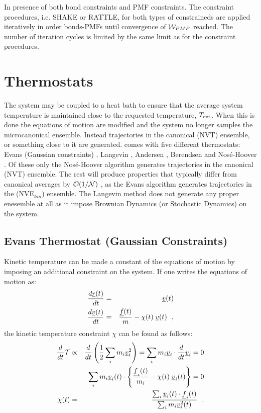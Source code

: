 In presence of both bond constraints and
PMF constraints.  The constraint procedures,
i.e. SHAKE or RATTLE, for both types of constraineds are applied
iteratively in order bonds-PMFs until convergence of ${\cal W}_{PMF}$
reached.  The number of iteration cycles is limited by the same limit
as for the constraint procedures.

\section{Thermostats}

The system may be coupled to a heat bath to ensure that the average
system temperature is maintained close to the requested temperature,
$T_{\rm ext}$.  When this is done the equations of motion are
modified and the system no longer samples the microcanonical
ensemble.  Instead trajectories in the canonical
(NVT) ensemble, or something close to it
are generated.  \D comes with five different thermostats: Evans
(Gaussian constraints) \cite{evans-84a},
Langevin \cite{adelman-76a,izaguirre-01}, Andersen \cite{andersen-79a},
Berendsen \cite{berendsen-84a} and Nos\'e-Hoover \cite{hoover-85a}. Of
these only the Nos\'e-Hoover algorithm generates trajectories in the
canonical (NVT) ensemble.  The rest will produce properties that
typically differ from canonical averages by
${\cal O}(1/{\cal N})$ \cite{allen-89a}, as the Evans algorithm
generates trajectories in the (NVE$_{kin}$) ensemble.
The Langevin method does not generate any proper enesemble at all
as it impose Brownian Dynamics (or Stochastic Dynamics) on the system.

\subsection{Evans Thermostat (Gaussian Constraints)}

Kinetic temperature can be made a constant of the equations of
motion by imposing an additional constraint on the system.  If one
writes the equations of motion as:
\begin{eqnarray}
{d \mbox{$\underline{r}$}(t) \over d t} &=& \mbox{$\underline{v}$}(t) \nonumber \\
{d \mbox{$\underline{v}$}(t) \over d t} &=& {\mbox{$\underline{f}$}(t) \over m} - \chi (t) \;
\mbox{$\underline{v}$}(t)~~,
\end{eqnarray}
the kinetic temperature constraint $\chi$ can be found as follows:
\begin{eqnarray}
\frac{d}{dt} {\cal T} &\propto& \frac{d}{dt} \left(\frac{1}{2}\sum_{i} m_{i} \mbox{$\underline{v}$}_{i}^{2} \right) =
\sum_{i} m_{i} \mbox{$\underline{v}$}_{i} \cdot \frac{d}{dt} \mbox{$\underline{v}$}_{i} = 0 \nonumber \\
& & \sum_{i} m_{i} \mbox{$\underline{v}$}_{i}(t) \cdot
\left\{ \frac{\mbox{$\underline{f}$}_{i}(t)}{m_{i}} - \chi (t) \; \mbox{$\underline{v}$}_{i}(t) \right\} = 0 \\ \label{Evans}
\chi (t) &=& \frac {\sum_{i} \mbox{$\underline{v}$}_{i}(t) \cdot \mbox{$\underline{f}$}_{i}(t)} {\sum_{i} m_{i} \mbox{$\underline{v}$}_{i}^{2}(t)}~~. \nonumber
\end{eqnarray}

